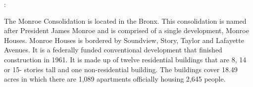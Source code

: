 :    

  

The Monroe Consolidation is located in the Bronx. This consolidation is named after President James Monroe and is comprised of a single development, Monroe Houses. Monroe Houses is bordered by Soundview, Story, Taylor and Lafayette Avenues. It is a federally funded conventional development that finished construction in 1961. It is made up of twelve residential buildings that are 8, 14 or 15- stories tall and one non-residential building. The buildings cover 18.49 acres in which there are 1,089 apartments officially housing 2,645 people.   